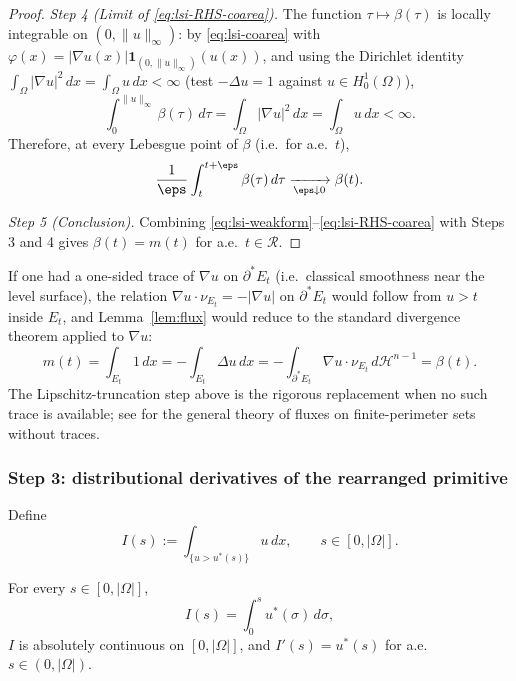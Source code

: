 \begin{proof}
\smallskip\noindent
\emph{Step 4 (Limit of \eqref{eq:lsi-RHS-coarea}).}
The function $\tau\mapsto\beta(\tau)$ is locally integrable on
$(0,\|u\|_{\infty})$: by \eqref{eq:lsi-coarea} with
$\varphi(x)=|\nabla u(x)|\mathbf 1_{(0,\|u\|_{\infty})}(u(x))$, and using
the Dirichlet identity
$\int_{\Omega}|\nabla u|^{2}\,dx=\int_{\Omega}u\,dx<\infty$ (test
$-\Delta u=1$ against $u\in H^{1}_{0}(\Omega)$),
\[
   \int_{0}^{\|u\|_{\infty}}\beta(\tau)\,d\tau
   =\int_{\Omega}|\nabla u|^{2}\,dx
   =\int_{\Omega}u\,dx<\infty.
\]
Therefore, at every Lebesgue point of $\beta$ (i.e.\ for a.e.\ $t$),
\[
   \frac{1}{\eps}\int_{t}^{t+\eps}\beta(\tau)\,d\tau
   \xrightarrow[\eps\downarrow 0]{}\beta(t).
\]

\smallskip\noindent
\emph{Step 5 (Conclusion).}
Combining \eqref{eq:lsi-weakform}--\eqref{eq:lsi-RHS-coarea} with Steps 3
and 4 gives $\beta(t)=m(t)$ for a.e.\ $t\in\mathcal R$.
\end{proof}

\begin{remark}\label{rem:divergence}
If one had a one-sided trace of $\nabla u$ on $\partial^{*}E_{t}$ (i.e.\
classical smoothness near the level surface), the relation
$\nabla u\cdot\nu_{E_{t}}=-|\nabla u|$ on $\partial^{*}E_{t}$ would
follow from $u>t$ inside $E_{t}$, and Lemma~\ref{lem:flux} would reduce
to the standard divergence theorem
\cite[Theorem 16.3]{Maggi2012} applied to $\nabla u$:
\[
   m(t)=\int_{E_{t}}1\,dx=-\int_{E_{t}}\Delta u\,dx
   =-\int_{\partial^{*}E_{t}}\nabla u\cdot\nu_{E_{t}}\,d\mathcal H^{n-1}
   =\beta(t).
\]
The Lipschitz-truncation step above is the rigorous replacement when no
such trace is available; see \cite[Chapter 17]{Maggi2012} for the
general theory of fluxes on finite-perimeter sets without traces.
\end{remark}

\subsubsection{Step 3: distributional derivatives of the rearranged
primitive}
\label{sssec:lsi-Iprime}

Define
\begin{equation}\label{eq:lsi-Idef}
   I(s):=\int_{\{u>u^{*}(s)\}}u\,dx,\qquad s\in[0,|\Omega|].
\end{equation}

\begin{lemma}\label{lem:Iab}
For every $s\in[0,|\Omega|]$,
\begin{equation}\label{eq:lsi-Ilayer}
   I(s)=\int_{0}^{s}u^{*}(\sigma)\,d\sigma,
\end{equation}
$I$ is absolutely continuous on $[0,|\Omega|]$, and $I'(s)=u^{*}(s)$ for
a.e.\ $s\in(0,|\Omega|)$.
\end{lemma}

